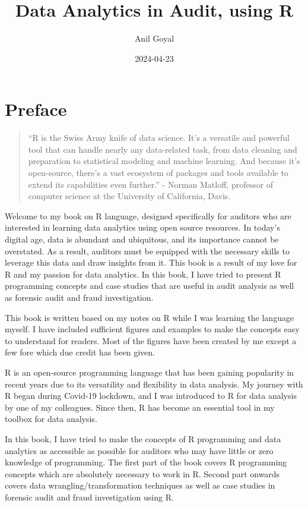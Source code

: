 \documentclass[
]{book}
\title{Data Analytics in Audit, using R}
\author{Anil Goyal}
\date{2024-04-23}
\begin{document}
\maketitle

{
\setcounter{tocdepth}{1}
\tableofcontents
}
\hypertarget{preface}{%
\chapter*{Preface}\label{preface}}

\begin{quote}
``R is the Swiss Army knife of data science. It's a versatile and powerful tool that can handle nearly any data-related task, from data cleaning and preparation to statistical modeling and machine learning. And because it's open-source, there's a vast ecosystem of packages and tools available to extend its capabilities even further.'' - Norman Matloff, professor of computer science at the University of California, Davis.
\end{quote}

Welcome to my book on R language, designed specifically for auditors who are interested in learning data analytics using open source resources. In today's digital age, data is abundant and ubiquitous, and its importance cannot be overstated. As a result, auditors must be equipped with the necessary skills to leverage this data and draw insights from it. This book is a result of my love for R and my passion for data analytics. In this book, I have tried to present R programming concepts and case studies that are useful in audit analysis as well as forensic audit and fraud investigation.

This book is written based on my notes on R while I was learning the language myself. I have included sufficient figures and examples to make the concepts easy to understand for readers. Most of the figures have been created by me except a few fore which due credit has been given.

R is an open-source programming language that has been gaining popularity in recent years due to its versatility and flexibility in data analysis. My journey with R began during Covid-19 lockdown, and I was introduced to R for data analysis by one of my colleagues. Since then, R has become an essential tool in my toolbox for data analysis.

In this book, I have tried to make the concepts of R programming and data analytics as accessible as possible for auditors who may have little or zero knowledge of programming. The first part of the book covers R programming concepts which are absolutely necessary to work in R. Second part onwards covers data wrangling/transformation techniques as well as case studies in forensic audit and fraud investigation using R.
\end{document}
